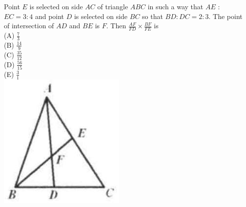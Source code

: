 \documentclass{article}
\begin{document}
Point \(E\) is selected on side \(A C\) of triangle \(A B C\) in such a way that \(A E\) : \(E C=3: 4\) and point \(D\) is selected on side \(B C\) so that \(B D: D C=2: 3\). The point of intersection of \(A D\) and \(B E\) is \(F\). Then \(\frac{A F}{F D} \times \frac{B F}{F E}\) is\\
(A) \(\frac{7}{3}\)\\
(B) \(\frac{14}{9}\)\\
(C) \(\frac{35}{12}\)\\
(D) \(\frac{56}{15}\)\\
(E) \(\frac{3}{1}\)\\
\centering
\includegraphics[width=\textwidth]{images/106.jpg}
\end{document}
